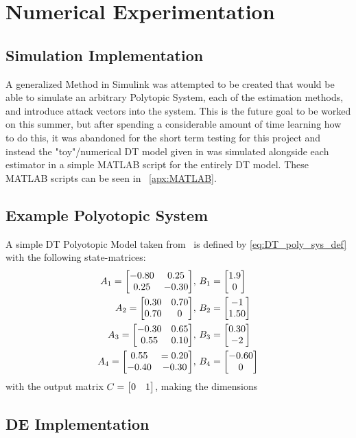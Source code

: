 \documentclass[]{article}
\begin{document}
\newpage
\section{Numerical Experimentation}

\subsection{Simulation Implementation}
A generalized Method in Simulink was attempted to be created that would be able to simulate an arbitrary Polytopic System, each of the estimation methods, and introduce attack vectors into the system. This is the future goal to be worked on this summer, but after spending a considerable amount of time learning how to do this, it was abandoned for the short term testing for this project and instead the "toy"/numerical DT model given in \cite{beelen2017joint} was simulated alongside each estimator in a simple MATLAB script for the entirely DT model. These MATLAB scripts can be seen in \appendixname \ \ref{apx:MATLAB}.

\subsection{Example Polyotopic System}
A simple DT Polyotopic Model taken from \cite{beelen2017joint} \ is defined by \eqref{eq:DT_poly_sys_def} with the following state-matrices:
\begin{equation}
	\begin{aligned}
		A_1 = \mqty[-0.80 & 0.25\\ 0.25 & -0.30], \ &B_1 = \mqty[1.9\\0]\\
		A_2 = \mqty[0.30 & 0.70\\ 0.70 &0], \ &B_2 = \mqty[-1\\ 1.50]\\
		A_3 = \mqty[-0.30 & 0.65\\ 0.55 &0.10], \ &B_3 = \mqty[0.30\\ -2]\\
		A_4 = \mqty[0.55 & =0.20\\ -0.40 &-0.30], \ &B_4 = \mqty[-0.60\\0]
	\end{aligned}
\end{equation}
with the output matrix $C = \mqty[0 &1]$, making the dimensions 




\subsection{DE Implementation}
\end{document}
